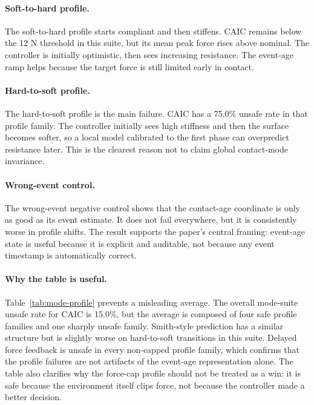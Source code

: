 \documentclass{article}
\newcommand{\caic}{CAIC}
\begin{document}
\paragraph{Soft-to-hard profile.}
The soft-to-hard profile starts compliant and then stiffens. \caic{} remains below the 12 N threshold in this suite, but its mean peak force rises above nominal. The controller is initially optimistic, then sees increasing resistance. The event-age ramp helps because the target force is still limited early in contact.

\paragraph{Hard-to-soft profile.}
The hard-to-soft profile is the main failure. \caic{} has a 75.0\% unsafe rate in that profile family. The controller initially sees high stiffness and then the surface becomes softer, so a local model calibrated to the first phase can overpredict resistance later. This is the clearest reason not to claim global contact-mode invariance.

\paragraph{Wrong-event control.}
The wrong-event negative control shows that the contact-age coordinate is only as good as its event estimate. It does not fail everywhere, but it is consistently worse in profile shifts. The result supports the paper's central framing: event-age state is useful because it is explicit and auditable, not because any event timestamp is automatically correct.

\paragraph{Why the table is useful.}
Table~\ref{tab:mode-profile} prevents a misleading average. The overall mode-suite unsafe rate for \caic{} is 15.0\%, but the average is composed of four safe profile families and one sharply unsafe family. Smith-style prediction has a similar structure but is slightly worse on hard-to-soft transitions in this suite. Delayed force feedback is unsafe in every non-capped profile family, which confirms that the profile failures are not artifacts of the event-age representation alone. The table also clarifies why the force-cap profile should not be treated as a win: it is safe because the environment itself clips force, not because the controller made a better decision.
\end{document}
